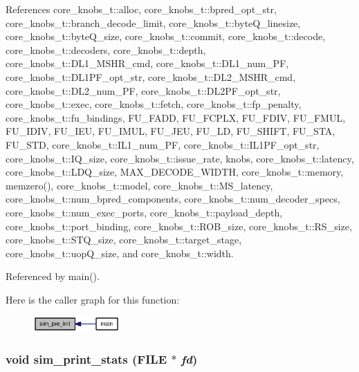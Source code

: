 References core\_\-knobs\_\-t::alloc, core\_\-knobs\_\-t::bpred\_\-opt\_\-str, core\_\-knobs\_\-t::branch\_\-decode\_\-limit, core\_\-knobs\_\-t::byteQ\_\-linesize, core\_\-knobs\_\-t::byteQ\_\-size, core\_\-knobs\_\-t::commit, core\_\-knobs\_\-t::decode, core\_\-knobs\_\-t::decoders, core\_\-knobs\_\-t::depth, core\_\-knobs\_\-t::DL1\_\-MSHR\_\-cmd, core\_\-knobs\_\-t::DL1\_\-num\_\-PF, core\_\-knobs\_\-t::DL1PF\_\-opt\_\-str, core\_\-knobs\_\-t::DL2\_\-MSHR\_\-cmd, core\_\-knobs\_\-t::DL2\_\-num\_\-PF, core\_\-knobs\_\-t::DL2PF\_\-opt\_\-str, core\_\-knobs\_\-t::exec, core\_\-knobs\_\-t::fetch, core\_\-knobs\_\-t::fp\_\-penalty, core\_\-knobs\_\-t::fu\_\-bindings, FU\_\-FADD, FU\_\-FCPLX, FU\_\-FDIV, FU\_\-FMUL, FU\_\-IDIV, FU\_\-IEU, FU\_\-IMUL, FU\_\-JEU, FU\_\-LD, FU\_\-SHIFT, FU\_\-STA, FU\_\-STD, core\_\-knobs\_\-t::IL1\_\-num\_\-PF, core\_\-knobs\_\-t::IL1PF\_\-opt\_\-str, core\_\-knobs\_\-t::IQ\_\-size, core\_\-knobs\_\-t::issue\_\-rate, knobs, core\_\-knobs\_\-t::latency, core\_\-knobs\_\-t::LDQ\_\-size, MAX\_\-DECODE\_\-WIDTH, core\_\-knobs\_\-t::memory, memzero(), core\_\-knobs\_\-t::model, core\_\-knobs\_\-t::MS\_\-latency, core\_\-knobs\_\-t::num\_\-bpred\_\-components, core\_\-knobs\_\-t::num\_\-decoder\_\-specs, core\_\-knobs\_\-t::num\_\-exec\_\-ports, core\_\-knobs\_\-t::payload\_\-depth, core\_\-knobs\_\-t::port\_\-binding, core\_\-knobs\_\-t::ROB\_\-size, core\_\-knobs\_\-t::RS\_\-size, core\_\-knobs\_\-t::STQ\_\-size, core\_\-knobs\_\-t::target\_\-stage, core\_\-knobs\_\-t::uopQ\_\-size, and core\_\-knobs\_\-t::width.

Referenced by main().

Here is the caller graph for this function:\nopagebreak
\begin{figure}[H]
\begin{center}
\leavevmode
\includegraphics[width=94pt]{sim_8h_6f8bfcc0d1d039d6fb378af082656f6f_icgraph}
\end{center}
\end{figure}
\subsubsection[{sim\_\-print\_\-stats}]{\setlength{\rightskip}{0pt plus 5cm}void sim\_\-print\_\-stats (FILE $\ast$ {\em fd})}\label{sim_8h_ebded8bcfea50ac2770a680b87509424}




